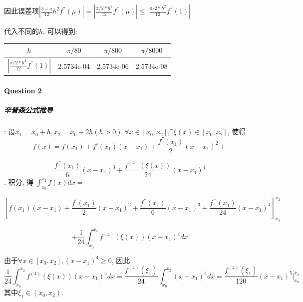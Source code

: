 \documentclass{article}
\begin{document}
\begin{CJK*}{UTF8}{song}
					因此误差项$\left|\frac{b-a}{12}h^2f^{''}\left(\mu\right) \right| = \left| \frac{\pi /2 *h^2}{12}f^{''}\left(\mu\right)\right| \leq \left|\frac{\pi /2 *h^2}{12} f^{''}\left(1\right) \right|$
					
					代入不同的$h$, 可以得到:
					\begin{center}
						\begin{tabular}{|c|c|c|c|}
							\hline
							$h$    & $\pi /80$ &$\pi /800$ & $\pi /8000$ \\
							\hline
							$ \left|\frac{\pi /2 *h^2}{12} f^{''}\left(1\right) \right| $ & 2.5734e-04
							& 2.5734e-06 & 2.5734e-08\\
							\hline
						\end{tabular}
					\end{center}
					
			\paragraph{Question 2}
				\subparagraph{辛普森公式推导}
				:\newline
					设$x_1 = x_0 + h, x_2 = x_0 + 2h\left(h>0\right)$
					$\forall x \in \left[x_0,x_2 \right]$,$\exists \xi \left(x \right) \in \left[x_0,x_2 \right]$, 使得
					$$f\left(x\right) = f\left(x_1\right) + f'\left(x_1\right)\left(x-x_1\right) + \frac{f^{''}\left(x_1\right)}{2}\left(x-x_1\right)^2 +$$
					
					$$ \frac{f^{'''}\left(x_1\right)}{6}\left(x-x_1\right)^3 + \frac{f^{\left(4\right)}\left(\xi\left(x\right)\right)}{24}\left(x-x_1\right)^4$$.
					积分, 得
					$\int_{x_0}^{x_2}f\left(x\right)dx = $
					
					$$\left[f\left(x_1\right)\left(x-x_1\right) + \frac{f^{'}\left(x_1\right)}{2}\left(x - x_1\right)^2 + \frac{f^{''}\left(x_1\right)}{6}\left(x - x_1\right)^3 + \frac{f^{'''}\left(x_1\right)}{24}\left(x-x_1\right)^4 \right]_{x_0}^{x_2}$$
					
					$$
					 + \frac{1}{24} \int_{x_0}^{x_2} f^{\left(4\right)}\left( \xi \left(x\right)\right)\left(x-x_1\right)^4 dx$$
					 
					 由于$\forall x \in \left[x_0,x_2\right],\left(x-x_1\right)^4 \geq 0$, 因此
					 $$ \frac{1}{24} \int_{x_0}^{x_2} f^{\left(4\right)}\left( \xi \left(x\right)\right)\left(x-x_1\right)^4 dx = \frac{f^{\left(4\right)}\left(\xi_1\right)}{24} \int_{x_0}^{x_2} \left(x-x_1\right)^4 dx = 
					 \frac{f^{\left(4\right)}\left(\xi_1\right)}{120}\left(x-x_1\right)^5 |_{x_0}^{x_2}$$
					 其中$\xi_1 \in \left( x_0,x_2\right)$.
					 

\end{CJK*}
\end{document}
